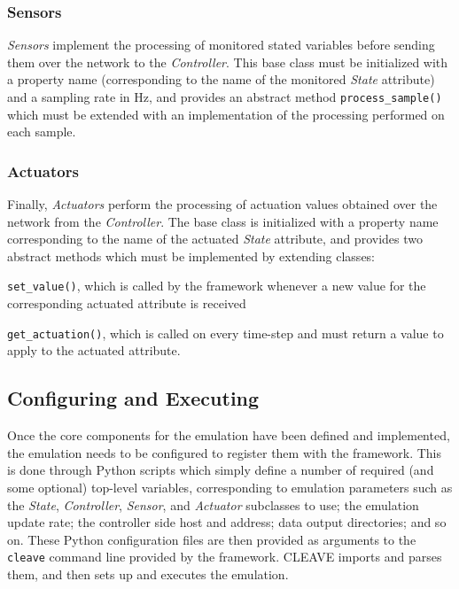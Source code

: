 \subsubsection{Sensors}

\emph{Sensors} implement the processing of monitored stated variables before sending them over the network to the \emph{Controller}.
This base class must be initialized with a property name (corresponding to the name of the monitored \emph{State} attribute) and a sampling rate in \si{\hertz}, and provides an abstract method \texttt{process_sample()} which must be extended with an implementation of the processing performed on each sample.

\subsubsection{Actuators}

Finally, \emph{Actuators} perform the processing of actuation values obtained over the network from the \emph{Controller}.
The base class is initialized with a property name corresponding to the name of the actuated \emph{State} attribute, and provides two abstract methods which must be implemented by extending classes:
\begin{enumerate*}[itemjoin={{; }}, itemjoin*={{; and }}]
    \item \texttt{set_value()}, which is called by the framework whenever a new value for the corresponding actuated attribute is received
    \item \texttt{get_actuation()}, which is called on every time-step and must return a value to apply to the actuated attribute.
\end{enumerate*}

\subsection{Configuring and Executing }

Once the core components for the emulation have been defined and implemented, the emulation needs to be configured to register them with the framework.
This is done through Python scripts which simply define a number of required (and some optional) top-level variables, corresponding to emulation parameters such as the \emph{State}, \emph{Controller}, \emph{Sensor}, and \emph{Actuator} subclasses to use; the emulation update rate; the controller side host and address; data output directories; and so on.
These Python configuration files are then provided as arguments to the \texttt{cleave} command line provided by the framework.
\ac{CLEAVE} imports and parses them, and then sets up and executes the emulation.

